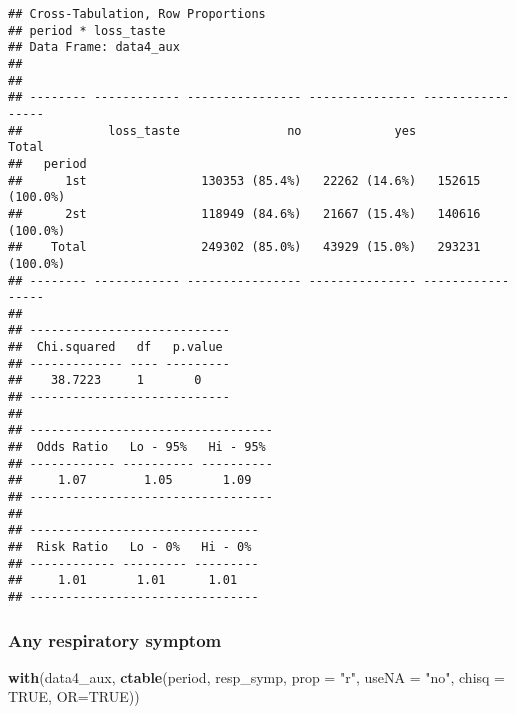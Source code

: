 \documentclass[
]{article}
\newenvironment{Shaded}{\begin{snugshade}}{\end{snugshade}}
\newcommand{\DataTypeTok}[1]{\textcolor[rgb]{0.13,0.29,0.53}{#1}}
\newcommand{\KeywordTok}[1]{\textcolor[rgb]{0.13,0.29,0.53}{\textbf{#1}}}
\newcommand{\NormalTok}[1]{#1}
\newcommand{\OtherTok}[1]{\textcolor[rgb]{0.56,0.35,0.01}{#1}}
\newcommand{\StringTok}[1]{\textcolor[rgb]{0.31,0.60,0.02}{#1}}
\begin{document}
\begin{verbatim}
## Cross-Tabulation, Row Proportions  
## period * loss_taste  
## Data Frame: data4_aux  
## 
## 
## -------- ------------ ---------------- --------------- -----------------
##            loss_taste               no             yes             Total
##   period                                                                
##      1st                130353 (85.4%)   22262 (14.6%)   152615 (100.0%)
##      2st                118949 (84.6%)   21667 (15.4%)   140616 (100.0%)
##    Total                249302 (85.0%)   43929 (15.0%)   293231 (100.0%)
## -------- ------------ ---------------- --------------- -----------------
## 
## ----------------------------
##  Chi.squared   df   p.value 
## ------------- ---- ---------
##    38.7223     1       0    
## ----------------------------
## 
## ----------------------------------
##  Odds Ratio   Lo - 95%   Hi - 95% 
## ------------ ---------- ----------
##     1.07        1.05       1.09   
## ----------------------------------
## 
## --------------------------------
##  Risk Ratio   Lo - 0%   Hi - 0% 
## ------------ --------- ---------
##     1.01       1.01      1.01   
## --------------------------------
\end{verbatim}

\hypertarget{any-respiratory-symptom-1}{%
\subsubsection{Any respiratory
symptom}\label{any-respiratory-symptom-1}}

\begin{Shaded}
\begin{Highlighting}[]
\KeywordTok{with}\NormalTok{(data4_aux, }\KeywordTok{ctable}\NormalTok{(period, resp_symp, }\DataTypeTok{prop =} \StringTok{"r"}\NormalTok{, }\DataTypeTok{useNA =} \StringTok{"no"}\NormalTok{, }\DataTypeTok{chisq =} \OtherTok{TRUE}\NormalTok{, }\DataTypeTok{OR=}\OtherTok{TRUE}\NormalTok{))}
\end{Highlighting}
\end{Shaded}
\end{document}
